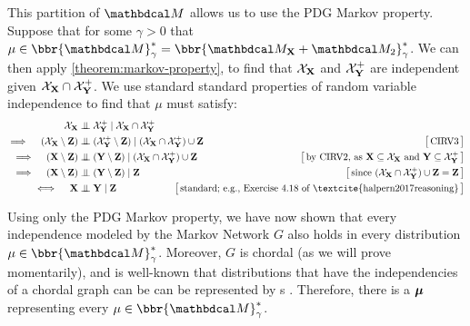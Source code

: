 \begin{subappendices}
\begin{lproof}
    This partition of $\dg M$ allows us to use the PDG Markov property.
    Suppose that for some $\gamma > 0$ that $\mu \in \bbr{\dg M}^*_\gamma = \bbr{\dg M_{\mat X} \bundle \dg M_2}^*_\gamma$.
    We can then apply \cref{theorem:markov-property}, to find that
    $\mathcal X_{\mathbf X}$ and $\mathcal X_{\mathbf Y}^+$ are independent given $\mathcal X_{\mathbf X} \cap \mathcal X_{\mathbf Y}^+$.
    We use standard standard properties of random variable independence
        \parencite[CIRV1-5 of][Theorem 4.4.4]{halpern2017reasoning} to find that $\mu$ must satisfy:
    \begin{align*}
        \XX  &\CI \XNX \mid \XX \cap \XNX\\
    \implies\quad
        (\XX \setminus \mat Z) &\CI (\XNX\setminus \mat Z) \mid (\XX \cap \XNX) \cup \mat Z
            & \big[\,\text{CIRV3}\,\big] \\
    \implies\quad
        (\mat X \setminus \mat Z) &\CI (\mat Y \setminus \mat Z) \mid (\XX \cap \XNX) \cup \mat Z
        & \big[\,\text{by CIRV2, as $\mat X \subseteq \XX$ and $\mat Y \subseteq \XNX$}\,\big] \\
    \implies\quad
        (\mat X \setminus \mat Z) &\CI (\mat Y \setminus \mat Z) \mid \mat Z
        & \big[\,\text{since $(\XX \cap \XNX) \cup \mat Z = \mat Z$}\,\big] \\
    \iff\quad
        \mat X &\CI \mat Y \mid \mat Z
        & \hspace{-4em}\big[\,\text{standard; e.g., Exercise 4.18 of \textcite{halpern2017reasoning}}\,\big] \\
    \end{align*}

    Using only the PDG Markov property, we have now shown that every independence
    modeled by the Markov Network $G$ also holds
    in every distribution $\mu \in \bbr{\dg M}^*_\gamma$. Moreover, $G$ is chordal (as we will prove momentarily),
    and is well-known that distributions that have the independencies of a chordal graph can be can be represented by \actree s \parencite[Theorem 4.12]{koller2009probabilistic}.
    Therefore, there is a \actree $\boldsymbol\mu$ representing every $\mu \in \bbr{\dg M}^*_\gamma$.


\end{lproof}
\end{subappendices}
